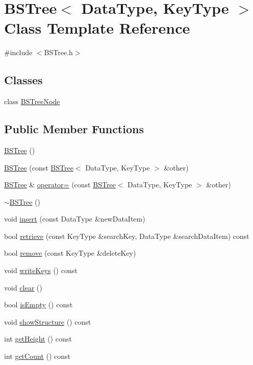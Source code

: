 \hypertarget{class_b_s_tree}{\section{B\+S\+Tree$<$ Data\+Type, Key\+Type $>$ Class Template Reference}
\label{class_b_s_tree}
}


{\ttfamily \#include $<$B\+S\+Tree.\+h$>$}

\subsection*{Classes}
\begin{DoxyCompactItemize}
\item 
class \hyperlink{class_b_s_tree_1_1_b_s_tree_node}{B\+S\+Tree\+Node}
\end{DoxyCompactItemize}
\subsection*{Public Member Functions}
\begin{DoxyCompactItemize}
\item 
\hyperlink{class_b_s_tree_a4513fc6697f5e51bff8e7c448b446c9e}{B\+S\+Tree} ()
\item 
\hyperlink{class_b_s_tree_a6658391c178cb35858c9c465e1839fb0}{B\+S\+Tree} (const \hyperlink{class_b_s_tree}{B\+S\+Tree}$<$ Data\+Type, Key\+Type $>$ \&other)
\item 
\hyperlink{class_b_s_tree}{B\+S\+Tree} \& \hyperlink{class_b_s_tree_ac36b0b564aa3c411c239d730f506f448}{operator=} (const \hyperlink{class_b_s_tree}{B\+S\+Tree}$<$ Data\+Type, Key\+Type $>$ \&other)
\item 
\hyperlink{class_b_s_tree_a968c51c539f4ae41357c78b6a60fea4c}{$\sim$\+B\+S\+Tree} ()
\item 
void \hyperlink{class_b_s_tree_ab86b4cea496ee53076021126423d51fd}{insert} (const Data\+Type \&new\+Data\+Item)
\item 
bool \hyperlink{class_b_s_tree_a4359bfee390669b5adaf0380ef62b18d}{retrieve} (const Key\+Type \&search\+Key, Data\+Type \&search\+Data\+Item) const 
\item 
bool \hyperlink{class_b_s_tree_a755549f7b88d0178a96ca84afd5e04cf}{remove} (const Key\+Type \&delete\+Key)
\item 
void \hyperlink{class_b_s_tree_a7f08f48e6d1bbe3eb726856a947325e7}{write\+Keys} () const 
\item 
void \hyperlink{class_b_s_tree_a926822d08f3d0321603f9fafd2254b16}{clear} ()
\item 
bool \hyperlink{class_b_s_tree_a43768375369ca8fe641a86451997ad45}{is\+Empty} () const 
\item 
void \hyperlink{class_b_s_tree_ac28277cacbf8ab33326473a419abf097}{show\+Structure} () const 
\item 
int \hyperlink{class_b_s_tree_a3850adc6b8ae965ec11ec0e0567b6f7d}{get\+Height} () const 
\item 
int \hyperlink{class_b_s_tree_a880d98553153533d3c29504e8a272c7d}{get\+Count} () const 
\end{DoxyCompactItemize}
